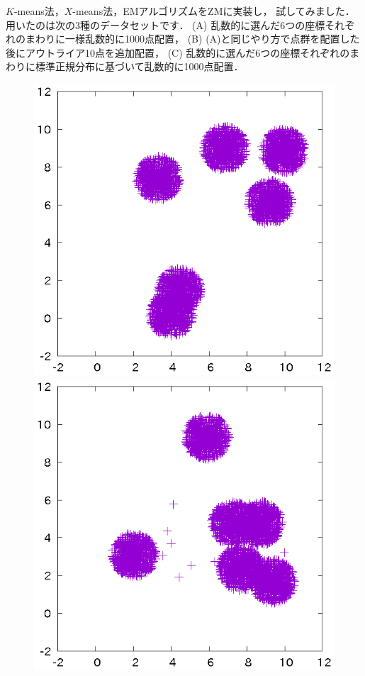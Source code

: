 ﻿\documentclass{jsarticle}
\begin{document}
$K$-means法，$X$-means法，EMアルゴリズムをZMに実装し，
試してみました．
用いたのは次の3種のデータセットです．
(A) 乱数的に選んだ6つの座標それぞれのまわりに一様乱数的に1000点配置，
(B) (A)と同じやり方で点群を配置した後にアウトライア10点を追加配置，
(C) 乱数的に選んだ6つの座標それぞれのまわりに標準正規分布に基づいて乱数的に1000点配置．
\begin{figure}[h]
\begin{center}
 \begin{minipage}{.32\textwidth}
 \begin{center}
 \includegraphics[height=.18\textheight]{fig/src2.eps}
 \end{center}
 \end{minipage}
 \begin{minipage}{.32\textwidth}
 \begin{center}
 \includegraphics[height=.18\textheight]{fig/src1.eps}

\end{center}
\end{minipage}
\end{center}
\end{figure}
\end{document}

